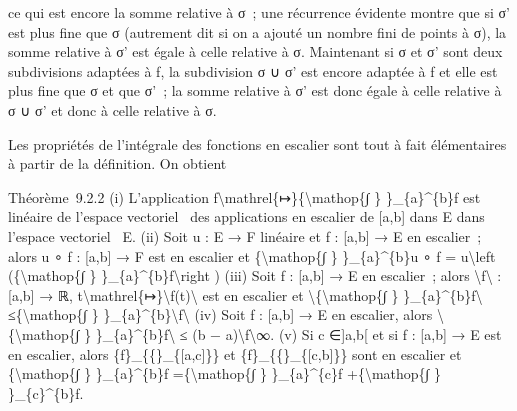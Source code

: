 \documentclass[]{article}
\begin{document}
ce qui est encore la somme relative à σ~; une récurrence évidente montre
que si σ' est plus fine que σ (autrement dit si on a ajouté un nombre
fini de points à σ), la somme relative à σ' est égale à celle relative à
σ. Maintenant si σ et σ' sont deux subdivisions adaptées à f, la
subdivision σ ∪ σ' est encore adaptée à f et elle est plus fine que σ et
que σ'~; la somme relative à σ' est donc égale à celle relative à σ ∪ σ'
et donc à celle relative à σ.

Les propriétés de l'intégrale des fonctions en escalier sont tout à fait
élémentaires à partir de la définition. On obtient

Théorème~9.2.2 (i) L'application
f\textbackslash{}mathrel\{↦\}\{\textbackslash{}mathop\{∫ \}
\}\_\{a\}\^{}\{b\}f est linéaire de l'espace vectoriel ~des applications
en escalier de {[}a,b{]} dans E dans l'espace vectoriel ~E. (ii) Soit u
: E → F linéaire et f : {[}a,b{]} → E en escalier~; alors u ∘ f :
{[}a,b{]} → F est en escalier et \{\textbackslash{}mathop\{∫ \}
\}\_\{a\}\^{}\{b\}u ∘ f = u\textbackslash{}left
(\{\textbackslash{}mathop\{∫ \} \}\_\{a\}\^{}\{b\}f\textbackslash{}right
) (iii) Soit f : {[}a,b{]} → E en escalier~; alors
\textbackslash{}\textbar{}f\textbackslash{}\textbar{} : {[}a,b{]} → ℝ,
t\textbackslash{}mathrel\{↦\}\textbackslash{}\textbar{}f(t)\textbackslash{}\textbar{}
est en escalier et \textbackslash{}\textbar{}\{\textbackslash{}mathop\{∫
\} \}\_\{a\}\^{}\{b\}f\textbackslash{}\textbar{}
≤\{\textbackslash{}mathop\{∫ \}
\}\_\{a\}\^{}\{b\}\textbackslash{}\textbar{}f\textbackslash{}\textbar{}
(iv) Soit f : {[}a,b{]} → E en escalier, alors
\textbackslash{}\textbar{}\{\textbackslash{}mathop\{∫ \}
\}\_\{a\}\^{}\{b\}f\textbackslash{}\textbar{} ≤ (b −
a)\textbackslash{}\textbar{}f\textbackslash{}\textbar{}∞. (v) Si c
∈{]}a,b{[} et si f : {[}a,b{]} → E est en escalier, alors
\{f\}\_\{\{\textbar{}\}\_\{{[}a,c{]}\}\} et
\{f\}\_\{\{\textbar{}\}\_\{{[}c,b{]}\}\} sont en escalier et
\{\textbackslash{}mathop\{∫ \} \}\_\{a\}\^{}\{b\}f
=\{\textbackslash{}mathop\{∫ \} \}\_\{a\}\^{}\{c\}f
+\{\textbackslash{}mathop\{∫ \} \}\_\{c\}\^{}\{b\}f.
\end{document}
